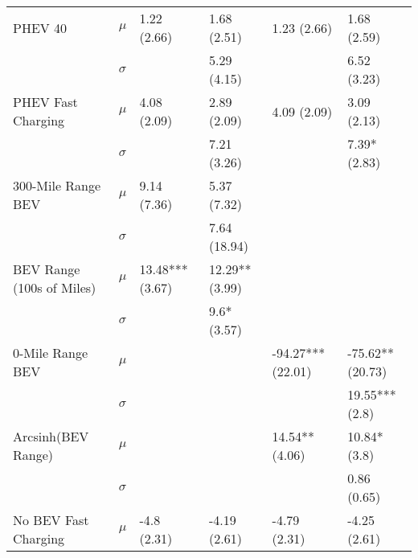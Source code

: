 \begin{tabular}{llllll}
                  PHEV 40 &     $\mu$ &                   1.22 (2.66) &                   1.68 (2.51) &                    1.23 (2.66) &                    1.68 (2.59) \\
                          &  $\sigma$ &                               &                   5.29 (4.15) &                                &                    6.52 (3.23) \\
       PHEV Fast Charging &     $\mu$ &                   4.08 (2.09) &                   2.89 (2.09) &                    4.09 (2.09) &                    3.09 (2.13) \\
                          &  $\sigma$ &                               &                   7.21 (3.26) &                                &                   7.39* (2.83) \\
       300-Mile Range BEV &     $\mu$ &                   9.14 (7.36) &                   5.37 (7.32) &                                &                                \\
                          &  $\sigma$ &                               &                  7.64 (18.94) &                                &                                \\
BEV Range (100s of Miles) &     $\mu$ &               13.48*** (3.67) &                12.29** (3.99) &                                &                                \\
                          &  $\sigma$ &                               &                   9.6* (3.57) &                                &                                \\
         0-Mile Range BEV &     $\mu$ &                               &                               &              -94.27*** (22.01) &               -75.62** (20.73) \\
                          &  $\sigma$ &                               &                               &                                &                 19.55*** (2.8) \\
       Arcsinh(BEV Range) &     $\mu$ &                               &                               &                 14.54** (4.06) &                   10.84* (3.8) \\
                          &  $\sigma$ &                               &                               &                                &                    0.86 (0.65) \\
     No BEV Fast Charging &     $\mu$ &                   -4.8 (2.31) &                  -4.19 (2.61) &                   -4.79 (2.31) &                   -4.25 (2.61) \\

\end{tabular}
